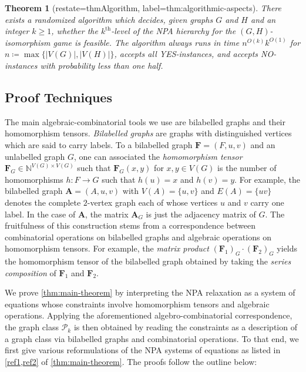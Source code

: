 \documentclass[11pt,a4paper]{article}
\theoremstyle{plain}
\newtheorem{thm}{Theorem}[section]
\theoremstyle{remark}
\theoremstyle{definition}
\begin{document}
\begin{thm}[restate=thmAlgorithm, label=thm:algorithmic-aspects]
    There exists a randomized algorithm which decides, given graphs $G$ and $H$ and an integer $k\geq 1$,
    whether the $k^{\text{th}}$-level of the NPA hierarchy for the $(G,H)$-isomorphism game is feasible.
    The algorithm always runs in time $n^{O(k)} k^{O(1)}$ for $n \coloneqq \max \{\lvert V(G) \rvert , \lvert V(H) \rvert  \}$, accepts all YES-instances, and accepts NO-instances with probability less than one half.
\end{thm}

\subsection{Proof Techniques}

The main algebraic-combinatorial tools we use are bilabelled graphs and their homomorphism tensors. \emph{Bilabelled graphs} are graphs with distinguished vertices which are said to carry labels. To a bilabelled graph $\boldsymbol{F} = (F, u, v)$ and an unlabelled graph $G$, one can associated the \emph{homomorphism tensor} $\boldsymbol{F}_G \in \mathbb{N}^{V(G) \times V(G)}$ such that $\boldsymbol{F}_G(x, y)$ for $x,y \in V(G)$ is the number of homomorphisms $h \colon F \to G$ such that $h(u) = x$ and $h(v) = y$.
For example, the bilabelled graph $\boldsymbol{A} = (A, u, v)$ with $V(A) = \{u,v\}$ and $E(A) = \{uv\}$ denotes the complete $2$-vertex graph each of whose vertices $u$ and $v$ carry one label.
In the case of $\boldsymbol{A}$, the matrix $\boldsymbol{A}_G$ is just the adjacency matrix of $G$.
The fruitfulness of this construction stems from a correspondence between combinatorial operations on bilabelled graphs and algebraic operations on homomorphism tensors.
For example, the \emph{matrix product} $(\boldsymbol{F}_1)_G \cdot (\boldsymbol{F}_2)_G$ yields the homomorphism tensor of the bilabelled graph obtained by taking the \emph{series composition} of $\boldsymbol{F}_1$ and $\boldsymbol{F}_2$.

We prove \cref{thm:main-theorem} by interpreting the NPA relaxation as a system of equations whose constraints involve homomorphism tensors and algebraic operations.
Applying the aforementioned algebro-combinatorial correspondence,
the graph class $\mathcal{P}_k$ is then obtained by reading the constraints as a description of a graph class via bilabelled graphs and combinatorial operations.
To that end, we first give various reformulations of the NPA systems of equations as listed in \cref{ref1,ref2} of \cref{thm:main-theorem}.
The proofs follow the outline below:
\end{document}
